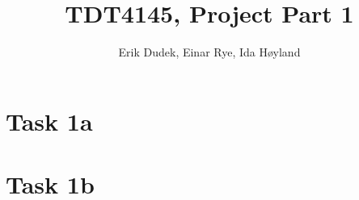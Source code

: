 \documentclass[a4paper,12pt]{article}
\begin{document}
\title{TDT4145, Project Part 1}
\author{Erik Dudek, Einar Rye, Ida Høyland}
\maketitle

\tableofcontents{}

\newpage{}

\section{Task 1a}

\newpage{}

\section{Task 1b}
\end{document}

